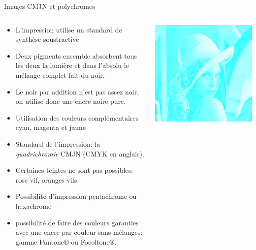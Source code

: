\begin{frame}{Images CMJN et polychromes}
  \begin{columns}
    \begin{column}{.8\linewidth}
      \begin{itemize}
      \item L'impression utilise un standard de synthèse soustractive
      \item Deux pigments ensemble absorbent tous les deux la lumière et dans
        l'absolu le mélange complet fait du noir.
      \item[\dialogerror] Le noir par addition n'est pas assez noir, on
        utilise donc une encre noire pure.
      \item Utilisation des couleurs complémentaires cyan, magenta et jaune
      \item Standard de l'impression: la \emph{quadrichromie} CMJN (CMYK en
        anglais).
      \item[\dialogerror] Certaines teintes ne sont pas possibles: rose vif,
        oranges vifs.
      \item Possibilité d'impression pentachrome ou hexachrome
      \item[\ddialogwarning] possibilité de faire des couleurs garanties avec
        une encre par couleur sans mélanges: gamme Pantone® ou Focoltone®.
      \end{itemize}
    \end{column}%
    \begin{column}{.15\linewidth}\centering
      \includegraphics[width=\linewidth]{img/06/lena-CMJN-cyan}\\

\end{column}
\end{columns}
\end{frame}
